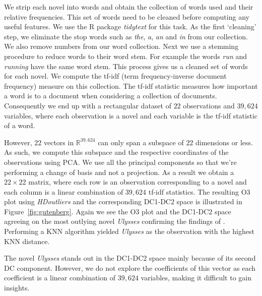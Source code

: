 \documentclass[a4paper,11pt]{article}
\begin{document}
We strip each novel into words and obtain the collection of words used and their relative frequencies. This set of words need to be cleaned before computing any useful features. We use the R package \textit{tidytext} \citep{tidytext} for this task. As the first `cleaning' step, we eliminate the stop words such as \textit{the}, \textit{a}, \textit{an} and \textit{in} from our collection. We also remove numbers from our word collection.  Next we use a stemming procedure to reduce words to their word stem. For example the words \textit{run} and \textit{running} have the same word stem. This process gives us a cleaned set of words for each novel. We compute the tf-idf (term frequency-inverse document frequency) measure on this collection. The tf-idf statistic measures how important a word is to a document when considering a collection of documents.  Consequently we end up with a rectangular dataset of $22$ observations and $39,624$ variables, where each observation is a novel and each variable is the tf-idf statistic of a word.

However, $22$ vectors in $\mathbb{R}^{39,624}$ can only span a subspace of $22$ dimensions or less. As such, we compute this subspace and the respective coordinates of the observations using PCA. We use all the principal components so that we're  performing a change of basis and not a projection. As a result we obtain a $22\times 22$ matrix, where each row is an observation corresponding to a novel and each column is a linear combination of $39,624$ tf-idf statistics. The resulting O3 plot using \textit{HDoutliers} and the corresponding DC1-DC2 space is illustrated in Figure~\ref{fig:gutenberg}. Again we see the O3 plot and the DC1-DC2 space agreeing on the most outlying novel \textit{Ulysses} confirming the findings of \cite{wilkinson2017visualizing}. Performing a KNN algorithm yielded \textit{Ulysses} as the observation with the highest KNN distance.

The novel \textit{Ulysses} stands out in the DC1-DC2 space mainly because of its second DC component. However, we do not explore the coefficients of this vector as each coefficient is a linear combination of  $39,624$ variables, making it difficult to gain insights.
\end{document}
